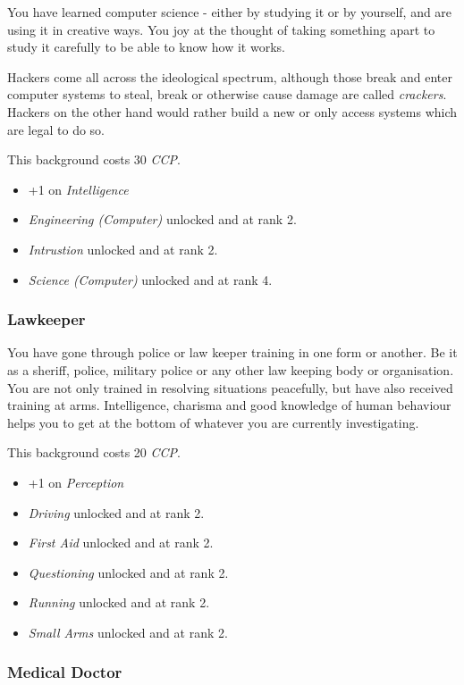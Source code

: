 You have learned computer science - either by studying it or by yourself,
and are using it in creative ways. You joy at the thought of taking something
apart to study it carefully to be able to know how it works.

Hackers come all across the ideological spectrum, although those break and
enter computer systems to steal, break or otherwise cause damage are called
\emph{crackers}. Hackers on the other hand would rather build a new or only
access systems which are legal to do so.

This background costs 30 \emph{CCP}.

\begin{itemize}
\item +1 on \emph{Intelligence}
\item \emph{Engineering (Computer)} unlocked and at rank 2.
\item \emph{Intrustion} unlocked and at rank 2.
\item \emph{Science (Computer)} unlocked and at rank 4.
\end{itemize}

\subsubsection{Lawkeeper}

You have gone through police or law keeper training in one form or another. Be
it as a sheriff, police, military police or any other law keeping body or
organisation. You are not only trained in resolving situations peacefully,
but have also received training at arms. Intelligence, charisma and good
knowledge of human behaviour helps you to get at the bottom of whatever you
are currently investigating.

This background costs 20 \emph{CCP}.

\begin{itemize}
\item +1 on \emph{Perception}
\item \emph{Driving} unlocked and at rank 2.
\item \emph{First Aid} unlocked and at rank 2.
\item \emph{Questioning} unlocked and at rank 2.
\item \emph{Running} unlocked and at rank 2.
\item \emph{Small Arms} unlocked and at rank 2.
\end{itemize}

\subsubsection{Medical Doctor}


